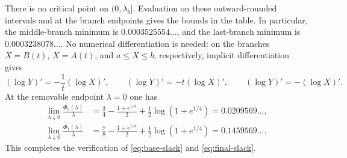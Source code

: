 \documentclass[reqno,final,12pt]{amsart}
\begin{document}
There is no critical point on $(0,\lambda_b]$.  Evaluation on these
outward-rounded intervals and at the branch endpoints gives the bounds
in the table.  In particular, the middle-branch minimum is
$0.0003525554\ldots$, and the last-branch minimum is
$0.0003238078\ldots$.  No numerical differentiation is needed: on
the branches $X=B(t)$, $X=A(t)$, and $a\leq X\leq b$, respectively,
implicit differentiation gives
\[
(\log Y)'=-\frac1t(\log X)',\qquad
(\log Y)'=-t(\log X)',\qquad
(\log Y)'=-(\log X)'.
\]
At the removable endpoint $\lambda=0$ one has
\begin{align*}
	\lim_{\lambda\downarrow0}\frac{\Phi_0(\lambda)}\lambda
	&=\frac34-\frac{1+e^{1/4}}2
	+\frac12\log(1+e^{1/4})=0.0209569\ldots,\\
	\lim_{\lambda\downarrow0}\frac{\Phi_1(\lambda)}\lambda
	&=\frac78-\frac{1+e^{1/4}}2
	+\frac12\log(1+e^{1/4})=0.1459569\ldots.
\end{align*}
This completes the verification of \eqref{eq:base-slack} and
\eqref{eq:final-slack}.
\end{document}
